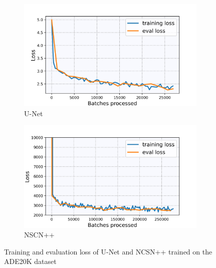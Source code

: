 %
\begin{figure}[] \label{fig:3.2}
    \centering
    \begin{subfigure}[b]{0.49\textwidth}
        \includegraphics[width=\textwidth]{Chapters/figures/experiments/ade/loss_ade_seg.jpg}
        \caption{U-Net}
    \end{subfigure}
    \begin{subfigure}[b]{0.49\textwidth}
        \includegraphics[width=\textwidth]{Chapters/figures/experiments/ade/loss_ade_ncsn.jpg}
        \caption{NSCN++}
    \end{subfigure}
    \caption[Losses of U-Net/NCSN++ on ADE20K dataset]{Training and evaluation loss of U-Net and NCSN++ trained on the ADE20K dataset}
\end{figure}
%
